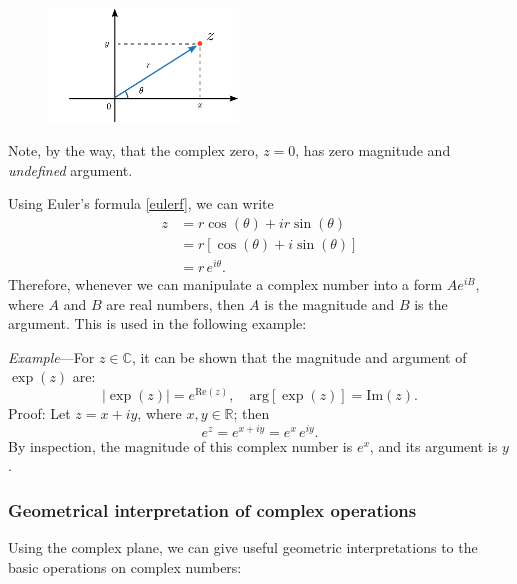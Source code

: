 \documentclass[10pt,a4paper]{article}
\begin{document}
\begin{figure}[ht]
  \centering\includegraphics[width=0.45\textwidth]{complex_plane2}
\end{figure}

Note, by the way, that the complex zero, $z = 0$, has zero magnitude
and \emph{undefined} argument.

Using Euler's formula \eqref{eulerf}, we can write
\begin{align}
  z &= r\cos(\theta) + i r\sin(\theta)\\
  &= r \left[\cos(\theta) + i \sin(\theta)\right] \\
  &= r \, e^{i\theta}.
\end{align}
Therefore, whenever we can manipulate a complex number into a form $A
e^{iB}$, where $A$ and $B$ are real numbers, then $A$ is the magnitude
and $B$ is the argument. This is used in the following example:


\begin{framed}\noindent
  \textit{Example}---For $z \in \mathbb{C}$, it can be shown that the
  magnitude and argument of $\exp(z)$ are:
  \begin{equation}
    \left|\exp(z)\right| = e^{\mathrm{Re}(z)}, \quad \mathrm{arg}\left[\exp(z)\right] = \mathrm{Im}(z).
  \end{equation}
  Proof: Let $z = x + i y$, where $x, y \in \mathbb{R}$; then
  \begin{equation}
    e^{z} = e^{x + i y} = e^x \, e^{iy}.
  \end{equation}
  By inspection, the magnitude of this complex number is $e^x$, and
  its argument is $y$.
\end{framed}

\subsubsection{Geometrical interpretation of complex operations}
\label{geometrical-interpretation-of-complex-operations}

Using the complex plane, we can give useful geometric interpretations to
the basic operations on complex numbers:
\end{document}
